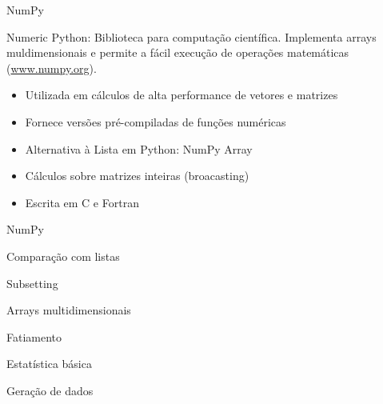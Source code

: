 \begin{frame}[t, fragile]{NumPy}
  \begin{block}{\alert{Num}eric \alert{Py}thon:}
    Biblioteca para computação científica. Implementa arrays muldimensionais e permite a fácil execução de operações matemáticas  (\url{www.numpy.org}).
  \end{block}
  \begin{itemize}
    \item Utilizada em cálculos de alta performance de vetores e matrizes 
    \item Fornece versões pré-compiladas de funções numéricas
    \item Alternativa à Lista em Python: NumPy Array
    \item Cálculos sobre matrizes inteiras (broacasting)
    \item Escrita em C e Fortran
  \end{itemize}
\end{frame}
%
\begin{frame}[t, fragile]{NumPy}
    
\end{frame}
%
\begin{frame}[t, fragile]{Comparação com listas}
    
\end{frame}
%
\begin{frame}[t, fragile]{Subsetting}
    
\end{frame}
%
\begin{frame}[t, fragile]{Arrays multidimensionais}
    
\end{frame}
%
\begin{frame}{Fatiamento}
    
\end{frame}
%
\begin{frame}[t, fragile]{Estatística básica}
    
\end{frame}
%
\begin{frame}[t, fragile]{Geração de dados}
    
\end{frame}
%

 
 